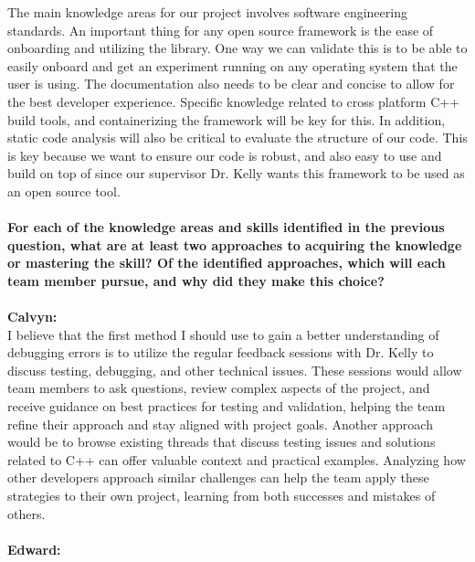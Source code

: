 \documentclass[12pt, titlepage]{article}
\begin{document}
    \noindent The main knowledge areas for our project involves software engineering standards. An important thing for any open source framework is the ease of onboarding and utilizing the library. One way we can validate this is to be able to easily onboard and get an experiment running on any operating system that the user is using. The documentation also needs to be clear and concise to allow for the best developer experience. Specific knowledge related to cross platform C++ build tools, and containerizing the framework will be key for this. In addition, static code analysis will also be critical to evaluate the structure of our code. This is key because we want to ensure our code is robust, and also easy to use and build on top of since our supervisor Dr. Kelly wants this framework to be used as an open source tool.
\\\\
\textbf{For each of the knowledge areas and skills identified in the previous
  question, what are at least two approaches to acquiring the knowledge or
  mastering the skill?  Of the identified approaches, which will each team
  member pursue, and why did they make this choice?}
\\\\

\noindent \textbf{Calvyn:}\\

\noindent I believe that the first method I should use to gain a better understanding of debugging errors is to utilize the regular feedback sessions with Dr. Kelly to discuss testing, debugging, and other technical issues. These sessions would allow team members to ask questions, review complex aspects of the project, and receive guidance on best practices for testing and validation, helping the team refine their approach and stay aligned with project goals. Another approach would be to browse existing threads that discuss testing issues and solutions related to C++ can offer valuable context and practical examples. Analyzing how other developers approach similar challenges can help the team apply these strategies to their own project, learning from both successes and mistakes of others.
\\\\
\textbf{Edward:}\\
\end{document}
